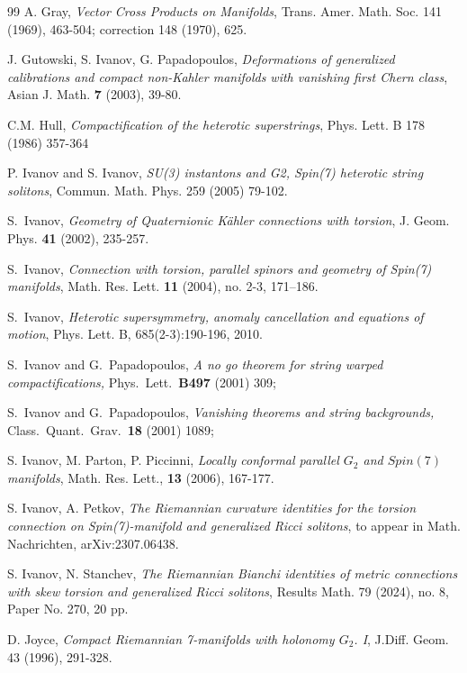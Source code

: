 \documentclass[10pt,british]{article}
\begin{document}
\begin{thebibliography}{99}
 A. Gray, \emph{Vector Cross Products on Manifolds}, Trans. Amer. Math. Soc. 141 (1969), 463-504;
correction 148 (1970), 625.

   J. Gutowski, S. Ivanov, G. Papadopoulos,
{\em Deformations of generalized calibrations and compact non-Kahler manifolds
with vanishing first Chern class}, Asian J. Math. {\bf 7} (2003), 39-80.

  
  C.M. Hull, \emph{Compactification of the heterotic superstrings}, Phys. Lett. B 178 (1986) 357-364


 P. Ivanov and S. Ivanov, \emph{SU(3) instantons and G2, Spin(7) heterotic string solitons},
Commun. Math. Phys. 259 (2005) 79-102.

 S.~Ivanov, \emph{Geometry of Quaternionic K\"ahler connections with torsion}, J. Geom.  Phys. {\bf 41} (2002), 235-257.

 S.~Ivanov, {\em Connection with torsion, parallel spinors and geometry of Spin(7) manifolds},
Math. Res. Lett.  {\bf 11} (2004), no. 2-3, 171--186.

 S.~Ivanov, \emph{Heterotic supersymmetry, anomaly cancellation and equations of motion}, Phys. Lett. B,
685(2-3):190-196, 2010.


  S.~Ivanov and G.~Papadopoulos,
  \textit{A no go theorem for string warped compactifications,}
  Phys.\ Lett.\  {\bf B497 } (2001)  309;

S.~Ivanov and G.~Papadopoulos,
  \textit{Vanishing theorems and string backgrounds,}
  Class.\ Quant.\ Grav.\  {\bf 18 } (2001)  1089;


 S. Ivanov, M. Parton, P. Piccinni, \emph{Locally conformal parallel $G_2$ and $Spin(7)$ manifolds},  Math. Res. Lett., {\bf
13} (2006), 167-177.

 S. Ivanov, A. Petkov, \emph{The Riemannian curvature identities for the torsion connection on Spin(7)-manifold and generalized Ricci solitons}, to appear in Math. Nachrichten, arXiv:2307.06438.

 S. Ivanov, N. Stanchev, \emph{The Riemannian Bianchi identities  of metric connections  with  skew  torsion and generalized Ricci solitons},  Results Math. 79 (2024), no. 8, Paper No. 270, 20 pp.%


 D. Joyce, {\em Compact Riemannian 7-manifolds with holonomy
  $G_2$. I}, J.Diff. Geom.  43 (1996), 291-328.


\end{thebibliography}
\end{document}

